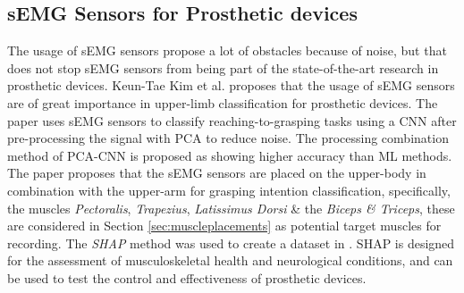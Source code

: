 \documentclass[../main.tex]{subfiles}
\begin{document}
\subsection{sEMG Sensors for Prosthetic devices}

The usage of sEMG sensors propose a lot of obstacles because of noise, but that does not stop sEMG sensors from being part of the state-of-the-art research in prosthetic devices.
Keun-Tae Kim et al. \cite{KeunTaeKim2021} proposes that the usage of sEMG sensors are of great importance in upper-limb classification for prosthetic devices.
The paper uses sEMG sensors to classify reaching-to-grasping tasks using a \gls{CNN} after pre-processing the signal with \gls{PCA} to reduce noise.
The processing combination method of PCA-CNN is proposed as showing higher accuracy than \gls{ML} methods.
The paper proposes that the sEMG sensors are placed on the upper-body in combination with the upper-arm for grasping intention classification, specifically, the muscles \textit{Pectoralis}, \textit{Trapezius}, \textit{Latissimus Dorsi} \& the \textit{Biceps \& Triceps}, these are considered in Section \ref{sec:muscleplacements} as potential target muscles for recording.
The \textit{\gls{SHAP}} \cite{shap} method was used to create a dataset in \cite{KeunTaeKim2021}.
\gls{SHAP} is designed for the assessment of musculoskeletal health and neurological conditions, and can be used to test the control and effectiveness of prosthetic devices.
\end{document}
